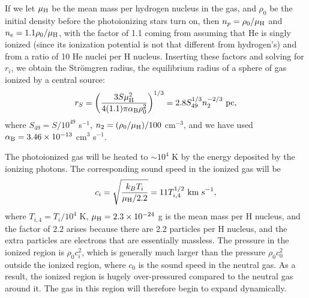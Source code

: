 If we let $\mu_{\rm H}$ be the mean mass per hydrogen nucleus in the gas, and $\rho_0$ be the initial density before the photoionizing stars turn on, then $n_p = \rho_0/\mu_{\rm H}$ and $n_e = 1.1 \rho_0/\mu_{\rm H}$, with the factor of 1.1 coming from assuming that He is singly ionized (since its ionization potential is not that different from hydrogen's) and from a ratio of 10 He nuclei per H nucleus. Inserting these factors and solving for $r_i$, we obtain the Str\"omgren radius, the equilibrium radius of a sphere of gas ionized by a central source:
\begin{equation}
r_S = \left(\frac{3 S \mu_{\rm H}^2}{4(1.1) \pi \alpha_{\mathrm{B}} \rho_0^2}\right)^{1/3} = 2.8 S_{49}^{1/3} n_2^{-2/3}\mbox{ pc},
\end{equation}
where $S_{49} = S/10^{49}$ s$^{-1}$, $n_2 = (\rho_0/\mu_{\rm H})/100$ cm$^{-3}$, and we have used $\alpha_{\mathrm{B}} = 3.46\times 10^{-13}$ cm$^3$ s$^{-1}$.

The photoionized gas will be heated to $\sim 10^4$ K by the energy deposited by the ionizing photons. The corresponding sound speed in the ionized gas will be
\begin{equation}
c_i = \sqrt{\frac{k_B T_i}{\mu_{\rm H}/2.2}} = 11 T_{i,4}^{1/2}\mbox{ km s}^{-1},
\end{equation}
where $T_{i,4} = T_i/10^4$ K, $\mu_{\rm H} = 2.3\times 10^{-24}$ g is the mean mass per H nucleus, and the factor of $2.2$ arises because there are 2.2 particles per H nucleus, and the extra particles are electrons that are essentially massless. The pressure in the ionized region is $\rho_0 c_i^2$, which is generally much larger than the pressure $\rho_0 c_0^2$ outside the ionized region, where $c_0$ is the sound speed in the neutral gas. As a result, the ionized region is hugely over-pressured compared to the neutral gas around it. The gas in this region will therefore begin to expand dynamically.

